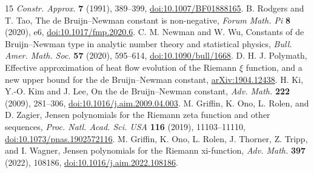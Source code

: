 \documentclass[11pt]{article}
\begin{document}
\begin{thebibliography}{15}
\emph{Constr. Approx.} \textbf{7} (1991), 389--399,
\href{https://doi.org/10.1007/BF01888165}{doi:10.1007/BF01888165}.
B. Rodgers and T. Tao,
The de Bruijn--Newman constant is non-negative,
\emph{Forum Math. Pi} \textbf{8} (2020), e6,
\href{https://doi.org/10.1017/fmp.2020.6}{doi:10.1017/fmp.2020.6}.
C. M. Newman and W. Wu,
Constants of de Bruijn--Newman type in analytic number theory
and statistical physics,
\emph{Bull. Amer. Math. Soc.} \textbf{57} (2020),
595--614,
\href{https://doi.org/10.1090/bull/1668}{doi:10.1090/bull/1668}.
D. H. J. Polymath,
Effective approximation of heat flow evolution of the
Riemann $\xi$ function, and a new upper bound
for the de Bruijn--Newman constant,
\href{https://arxiv.org/abs/1904.12438}{arXiv:1904.12438}.
H. Ki, Y.-O. Kim and J. Lee,
On the de Bruijn--Newman constant,
\emph{Adv. Math.} \textbf{222} (2009), 281--306,
\href{https://doi.org/10.1016/j.aim.2009.04.003}{doi:10.1016/j.aim.2009.04.003}.
M. Griffin, K. Ono, L. Rolen, and D. Zagier,
Jensen polynomials for the Riemann zeta function and other sequences,
\emph{Proc. Natl. Acad. Sci. USA} \textbf{116} (2019),
11103--11110,
\href{https://doi.org/10.1073/pnas.1902572116}{doi:10.1073/pnas.1902572116}.
M. Griffin, K. Ono, L. Rolen, J. Thorner, Z. Tripp, and I. Wagner,
Jensen polynomials for the Riemann xi-function,
\emph{Adv. Math.} \textbf{397} (2022), 108186,
\href{https://doi.org/10.1016/j.aim.2022.108186}{doi:10.1016/j.aim.2022.108186}.
\end{thebibliography}
\end{document}
